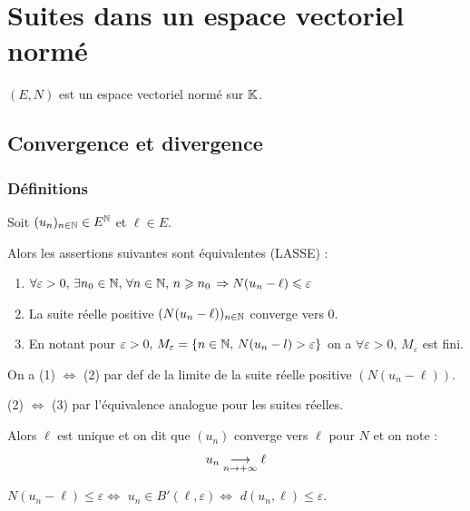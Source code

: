 \section{Suites dans un espace vectoriel normé}
$(E, N)$ est un espace vectoriel normé sur $\mathbb{K}$.
\subsection{Convergence et divergence}

\subsubsection{Définitions}

\begin{definition}{}{}
    Soit $(u_n)_{n \in \mathbb{N}} \in E^{\mathbb{N}}$ et $\ell \in E$. 

    Alors les assertions suivantes sont équivalentes (LASSE) : 

    \begin{enumerate}
        \item $\forall \varepsilon > 0, \, \exists n_0 \in \mathbb{N}, \, \forall n \in \mathbb{N}, \, n \geqslant n_0 \, \Rightarrow N(u_n - \ell) \leqslant \varepsilon$
        \item La suite réelle positive $(N(u_n - \ell))_{n \in \mathbb{N}}$ converge vers 0.
        \item En notant pour $\varepsilon > 0, \, M_\varepsilon = \{n \in \mathbb{N}, \, N(u_n - l) > \varepsilon\}$ on a
            $\forall \varepsilon > 0, \, M_\varepsilon$ est fini.
    \end{enumerate}

    On a (1) $\iff$ (2) par def de la limite de la suite réelle positive $(N(u_n - \ell))$.

    (2) $\iff$ (3) par l'équivalence analogue pour les suites réelles.

    Alors $\ell$ est unique et on dit que $(u_n)$ converge vers $\ell$ pour $N$ et on note :
    $$ u_n \underset{n \to +\infty}{\longrightarrow} \ell $$
\end{definition}

\begin{remarque}
    $N(u_n - \ell) \leqslant \varepsilon \iff$ $u_n \in B'(\ell, \varepsilon) \iff$ $d(u_n, \ell) \leqslant \varepsilon$.
\end{remarque}


